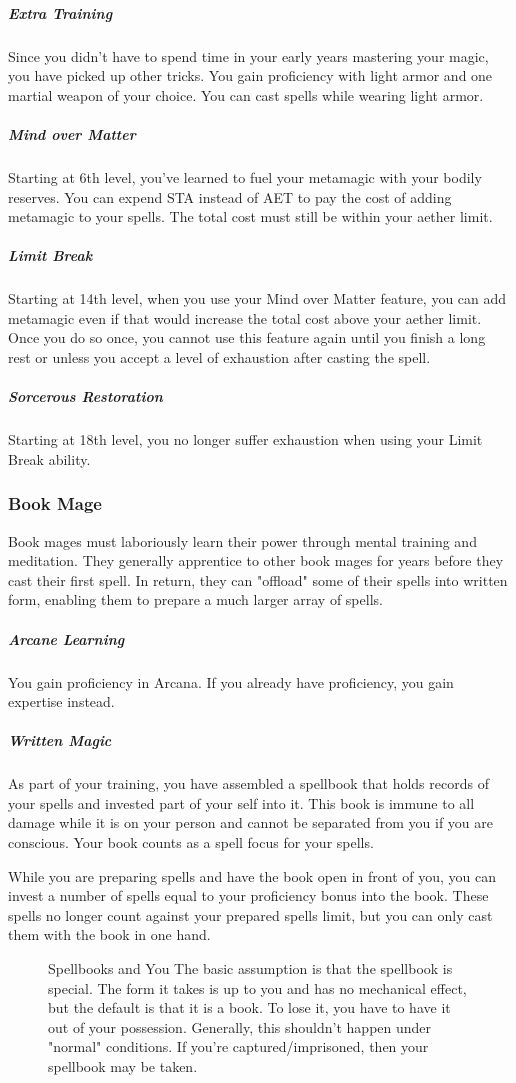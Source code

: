 \subparagraph*{Extra Training}
Since you didn't have to spend time in your early years mastering your magic, you have picked up other tricks. You gain proficiency with light armor and one martial weapon of your choice. You can cast spells while wearing light armor.

\subparagraph*{Mind over Matter}
Starting at 6th level, you've learned to fuel your metamagic with your bodily reserves. You can expend STA instead of AET to pay the cost of adding metamagic to your spells. The total cost must still be within your aether limit.

\subparagraph*{Limit Break}
Starting at 14th level, when you use your Mind over Matter feature, you can add metamagic even if that would increase the total cost above your aether limit. Once you do so once, you cannot use this feature again until you finish a long rest or unless you accept a level of exhaustion after casting the spell.

\subparagraph*{Sorcerous Restoration}
Starting at 18th level, you no longer suffer exhaustion when using your Limit Break ability.

\subsubsection{Book Mage}
Book mages must laboriously learn their power through mental training and meditation. They generally apprentice to other book mages for years before they cast their first spell. In return, they can "offload" some of their spells into written form, enabling them to prepare a much larger array of spells.

\subparagraph*{Arcane Learning}
You gain proficiency in Arcana. If you already have proficiency, you gain expertise instead.

\subparagraph*{Written Magic}
As part of your training, you have assembled a spellbook that holds records of your spells and invested part of your self into it. This book is immune to all damage while it is on your person and cannot be separated from you if you are conscious. Your book counts as a spell focus for your spells.

While you are preparing spells and have the book open in front of you, you can invest a number of spells equal to your proficiency bonus into the book. These spells no longer count against your prepared spells limit, but you can only cast them with the book in one hand.

\begin{figure}
	\begin{DndComment}{Spellbooks and You}
		The basic assumption is that the spellbook is special. The form it takes is up to you and has no mechanical effect, but the default is that it is a book. To lose it, you have to have it out of your possession. Generally, this shouldn't happen under "normal" conditions. If you're captured/imprisoned, then your spellbook may be taken.
	\end{DndComment}
\end{figure}

